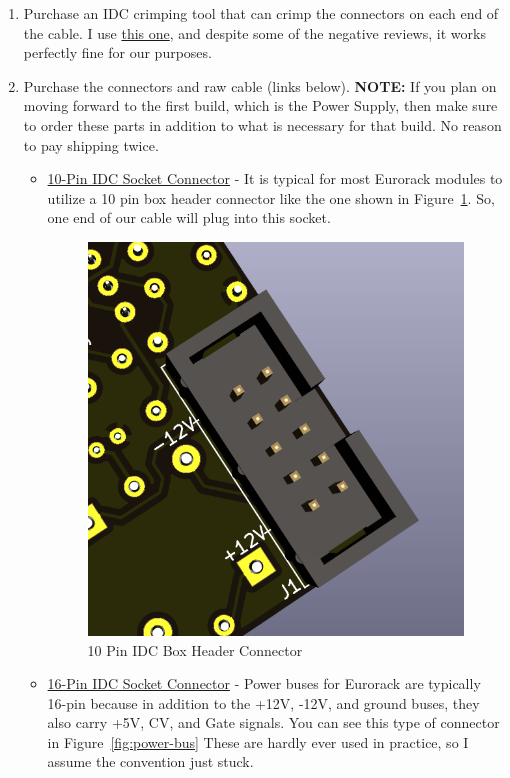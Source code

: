 \documentclass{article}
\begin{document}
\begin{enumerate}
	\item Purchase an IDC crimping tool that can crimp the connectors on each end of the cable. I use \href{https://www.amazon.com/Eowpower-Crimp-Ribbon-Cable-Connectors/dp/B072MM8X7Y/ref=sr_1_2_sspa?dchild=1&keywords=IDC+crimp+tool&qid=1602446375&sr=8-2-spons&psc=1&spLa=ZW5jcnlwdGVkUXVhbGlmaWVyPUExMVpQUjRCMDNPRTE3JmVuY3J5cHRlZElkPUEwOTA3OTM2UEpBMU5OVERDVFJDJmVuY3J5cHRlZEFkSWQ9QTAwNzI1NzBWMVhWV1ZVRVBGTE0md2lkZ2V0TmFtZT1zcF9hdGYmYWN0aW9uPWNsaWNrUmVkaXJlY3QmZG9Ob3RMb2dDbGljaz10cnVl}{this one}, and despite some of the negative reviews, it works perfectly fine for our purposes.
	\item Purchase the connectors and raw cable (links below). \textbf{NOTE:} If you plan on moving forward to the first build, which is the Power Supply, then make sure to order these parts in addition to what is necessary for that build. No reason to pay shipping twice.
	\begin{itemize}
		\item \href{https://www.taydaelectronics.com/idc-socket-connector-2-54mm-2-5-pin.html}{10-Pin IDC Socket Connector} - It is typical for most Eurorack modules to utilize a 10 pin box header connector like the one shown in Figure~\ref{fig:10-pin-connector}. So, one end of our cable will plug into this socket.
		\begin{figure}[h]
			\centering
			\includegraphics[width=.5\textwidth]{../Images/Fig_10_Pin_IDC}
			\caption{10 Pin IDC Box Header Connector}
			\label{fig:10-pin-connector}
		\end{figure}
		\item \href{https://www.taydaelectronics.com/idc-socket-connector-2-54mm-2-8-pin-single-contact..html}{16-Pin IDC Socket Connector} - Power buses for Eurorack are typically 16-pin because in addition to the +12V, -12V, and ground buses, they also carry +5V, CV, and Gate signals. You can see this type of connector in Figure~\ref{fig:power-bus} These are hardly ever used in practice, so I assume the convention just stuck.

\end{itemize}
\end{enumerate}
\end{document}
